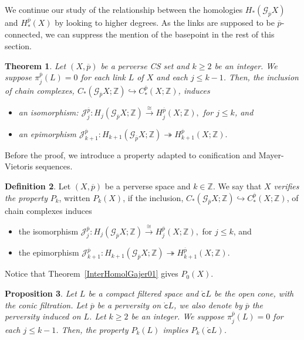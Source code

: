 \documentclass[a4paper,10pt,english,reqno]{amsart}
\theoremstyle{plain}
\newtheorem{proposition}{Proposition}[section]
\newtheorem{theoremb}[proposition]{Theorem}
\theoremstyle{definition}
\newtheorem{definition}[proposition]{Definition}
\theoremstyle{remark}
\numberwithin{equation}{section}
\newcommand{\thmref}[1]{Theorem~\ref{#1}}
\def\ov{\overline}
\def\cJ{{\mathcal J}}
\def\crG{{\mathscr G}}
\def\tc{{\mathtt c}}
\def\Z{\mathbb{Z}}
\def\rc{{\mathring{\tc}}}
\renewcommand\1{\hbox{\ding{192}}}
\renewcommand\2{\hbox{\ding{193}}}
\newcommand\3{\hbox{\ding{194}}}
\newcommand\4{\hbox{\ding{195}}}
\begin{document}
We continue our study of the relationship between the homologies $H_*(\crG_{\ov p} X)$ and $H_*^{\ov p}(X)$
by looking to higher degrees. 
As the links are supposed to be $\ov{p}$-connected, 
we can suppress the mention of the basepoint in the rest of this section.
%

\begin{theoremb}\label{InterHomolGajer}
Let $(X,\ov p)$ be a  perverse CS  set and $k\geq 2$ be an integer. 
We suppose
$\pi_{j}^{\ov p}(L)=0$ for each link  $L$ of $X$  and each $j\leq k-1$. 
Then, the  inclusion of chain complexes, $C_*(\crG_{\ov p}X;\Z) \hookrightarrow C_*^{\ov p}(X;\Z)$, induces
\begin{itemize}
\item[(i)]  an isomorphism:
$
\cJ_{j}^{\ov{p}}  \colon H_j (\crG_{\ov{p}}X;\Z)\stackrel{\cong}{\longrightarrow} H_j^{\ov p}(X;\Z),
$
for $j \leq k$, 
and
%
\item[(ii)] an epimorphism
$
\cJ_{k+1}^{\ov{p}}  \colon H_{k+1} (\crG_{\ov{p}}X;\Z)\twoheadrightarrow H_{k+1}^{\ov p}(X;\Z).
$
\end{itemize}
\end{theoremb}


Before  the proof, we introduce  a property  adapted to conification and Mayer-Vietoris sequences.



\begin{definition}\label{defBPk}
Let $(X,\ov p)$ be a perverse space and  $k \in \Z$.
We say that  $X$ \emph{verifies the property}  $P_k$, written $P_k(X)$, if the  inclusion,
$C_*(\crG_{\ov p}X;\Z) \hookrightarrow C_*^{\ov p}(X;\Z)$, of chain complexes induces
\begin{itemize}
\item[(i)]  the isomorphism
$
\cJ_{j}^{\ov{p}} \colon H_j (\crG_{\ov{p}}X;\Z)\stackrel{\cong}{\longrightarrow} H_j^{\ov p}(X;\Z),
$
for $j \leq k$, 
and
%
\item[(ii)]the epimorphism
$
\cJ_{k+1}^{\ov{p}} \colon H_{k+1} (\crG_{\ov{p}}X;\Z)\twoheadrightarrow H_{k+1}^{\ov p}(X;\Z).
$
\end{itemize}
\end{definition}

Notice that \thmref{InterHomolGajer01} gives $P_{0}(X)$.

\begin{proposition}\label{prop:LtocL}
 Let $L$ be a  compact  filtered space 
 and $\rc L$ be the open cone, with the conic filtration.
Let $\ov{p}$ be a   perversity on $\rc L$,  
we also denote  by $\ov{p}$ the perversity induced on $L$.
Let $k\geq  2$ be an integer. 
We suppose $\pi_{j}^{\ov p}(L)=0$ for each $j\leq k-1$. 
Then, the property $P_k(L)$ implies $P_k(\rc L)$.
%
%
\end{proposition}
\end{document}
